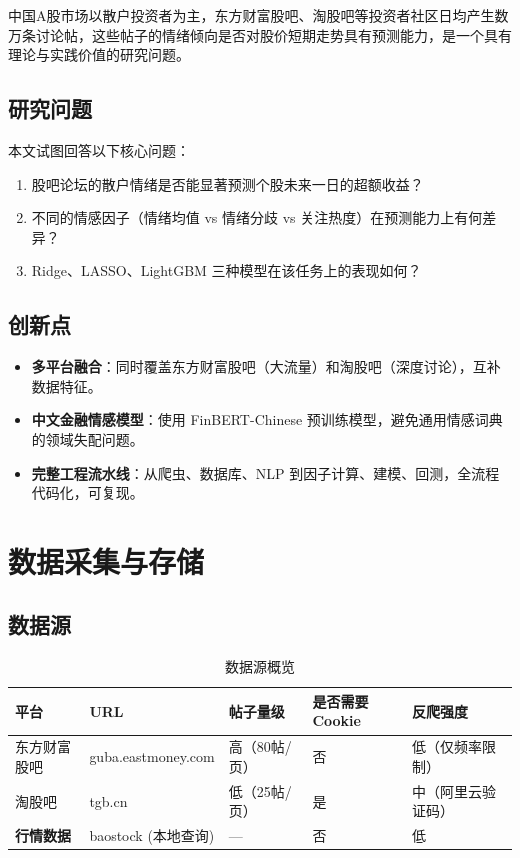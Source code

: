\documentclass[12pt,a4paper]{ctexart}
\begin{document}
中国A股市场以散户投资者为主，东方财富股吧、淘股吧等投资者社区日均产生数万条讨论帖，这些帖子的情绪倾向是否对股价短期走势具有预测能力，是一个具有理论与实践价值的研究问题。

\subsection{研究问题}

本文试图回答以下核心问题：

\begin{enumerate}[label=\textbf{Q\arabic*}, leftmargin=*]
    \item 股吧论坛的散户情绪是否能显著预测个股未来一日的超额收益？
    \item 不同的情感因子（情绪均值 vs 情绪分歧 vs 关注热度）在预测能力上有何差异？
    \item Ridge、LASSO、LightGBM 三种模型在该任务上的表现如何？
\end{enumerate}

\subsection{创新点}

\begin{itemize}
    \item \textbf{多平台融合}：同时覆盖东方财富股吧（大流量）和淘股吧（深度讨论），互补数据特征。
    \item \textbf{中文金融情感模型}：使用 FinBERT-Chinese 预训练模型，避免通用情感词典的领域失配问题。
    \item \textbf{完整工程流水线}：从爬虫、数据库、NLP 到因子计算、建模、回测，全流程代码化，可复现。
\end{itemize}

\newpage

\section{数据采集与存储}

\subsection{数据源}

\begin{table}[H]
    \centering
    \caption{数据源概览}
    \begin{tabular}{@{}lllll@{}}
        \toprule
        \textbf{平台} & \textbf{URL} & \textbf{帖子量级} & \textbf{是否需要Cookie} & \textbf{反爬强度} \\
        \midrule
        东方财富股吧 & guba.eastmoney.com & 高（80帖/页） & 否 & 低（仅频率限制） \\
        淘股吧 & tgb.cn & 低（25帖/页） & 是 & 中（阿里云验证码） \\
        \midrule
        \textbf{行情数据} & baostock (本地查询) & — & 否 & 低 \\
        \bottomrule
    \end{tabular}
\end{table}
\end{document}
